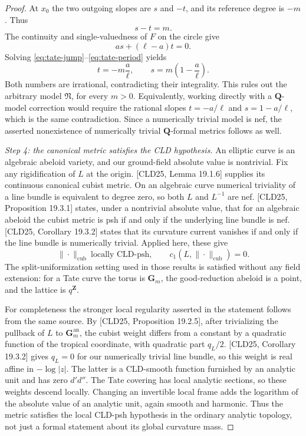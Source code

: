 \begin{proof}
At \(x_0\) the two outgoing slopes are \(s\) and \(-t\), and its
reference degree is \(-m\). Thus
\begin{equation}
\label{eq:tate-jump}
 s-t=m.
\end{equation}
The continuity and single-valuedness of \(F\) on the circle give
\begin{equation}
\label{eq:tate-period}
 as+(\ell-a)t=0.
\end{equation}
Solving \eqref{eq:tate-jump}--\eqref{eq:tate-period} yields
\[
 t=-m\frac{a}{\ell},\qquad
 s=m\left(1-\frac{a}{\ell}\right).
\]
Both numbers are irrational, contradicting their integrality. This
rules out the arbitrary model \(\mathfrak N\), for every \(m>0\).
Equivalently, working directly with a \(\mathbf Q\)-model correction
would require the rational slopes
\(t=-a/\ell\) and \(s=1-a/\ell\), which is the same contradiction.
Since a numerically trivial model is nef, the asserted nonexistence of
numerically trivial \(\mathbf Q\)-formal metrics follows as well.

\emph{Step 4: the canonical metric satisfies the CLD hypothesis.}
An elliptic curve is an algebraic abeloid variety, and our ground-field
absolute value is nontrivial. Fix any rigidification of \(L\) at the
origin. [CLD25, Lemma 19.1.6] supplies its continuous canonical cubist
metric. On an algebraic curve numerical triviality of a line bundle is
equivalent to degree zero, so both \(L\) and \(L^{-1}\) are nef.
[CLD25, Proposition 19.3.1] states, under a nontrivial absolute value,
that for an algebraic abeloid the cubist metric is psh if and only if
the underlying line bundle is nef. [CLD25, Corollary 19.3.2] states
that its curvature current vanishes if and only if the line bundle is
numerically trivial. Applied here, these give
\[
 \|\cdot\|_{\mathrm{cub}}\ \text{locally CLD-psh},
 \qquad c_1(L,\|\cdot\|_{\mathrm{cub}})=0.
\]
The split-uniformization setting used in those results is satisfied
without any field extension: for a Tate curve the torus is
\(\mathbf G_m\), the good-reduction abeloid is a point, and the lattice
is \(q^{\mathbf Z}\).

For completeness the stronger local regularity asserted in the
statement follows from the same source. By [CLD25, Proposition 19.2.5],
after trivializing the pullback of \(L\) to \(\mathbf G_m^{\mathrm{an}}\),
the cubist weight differs from a constant by a quadratic function of
the tropical coordinate, with quadratic part \(q_L/2\).
[CLD25, Corollary 19.3.2] gives \(q_L=0\) for our numerically trivial
line bundle, so this weight is real affine in \(-\log|z|\).
The latter is a CLD-smooth function furnished by an analytic unit and
has zero \(d'd''\). The Tate covering has local analytic sections, so
these weights descend locally. Changing an invertible local frame
adds the logarithm of the absolute value of an analytic unit, again
smooth and harmonic. Thus the metric satisfies the local CLD-psh
hypothesis in the ordinary analytic topology, not just a formal
statement about its global curvature mass.


\end{proof}
